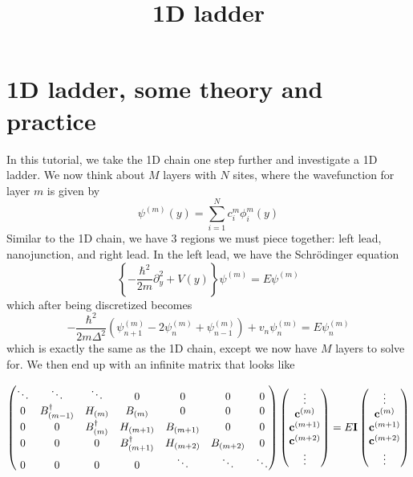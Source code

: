 \documentclass[11pt]{article}
\title{1D ladder}
\begin{document}
    
    
    \maketitle
    
    

    
    \section{1D ladder, some theory and
practice}\label{d-ladder-some-theory-and-practice}

In this tutorial, we take the 1D chain one step further and investigate
a 1D ladder. We now think about \(M\) layers with \(N\) sites, where the
wavefunction for layer \(m\) is given by \[
\psi^{(m)}(y) = \sum_{i=1}^{N} c_i^m \phi_i^m(y)
\] Similar to the 1D chain, we have 3 regions we must piece together:
left lead, nanojunction, and right lead. In the left lead, we have the
Schrödinger equation \[
\left\{-\frac{\hbar^2}{2m}\partial_y^2 + V(y)\right\}\psi^{(m)} = E\psi^{(m)}
\] which after being discretized becomes \[
-\frac{\hbar^2}{2m\Delta^2}(\psi_{n+1}^{(m)} - 2 \psi_{n}^{(m)} + \psi_{n-1}^{(m)}) + v_n\psi_n^{(m)} = E\psi_n^{(m)}
\] which is exactly the same as the 1D chain, except we now have \(M\)
layers to solve for. We then end up with an infinite matrix that looks
like

\begin{equation}
\begin{pmatrix}
\ddots & \ddots         & \ddots       & 0         & 0      & 0       & 0 \\
0 & B_{(m-1)}^{\dagger} & H_{(m)}          & B_{(m)}        & 0       & 0      & 0 \\
0 & 0        & B_{(m)}^{\dagger} & H_{(m+1)}          & B_{(m+1)} & 0      & 0 \\
0 & 0        & 0       & B_{(m+1)}^{\dagger} & H_{(m+2)}          & B_{(m+2)} & 0\\
0 & 0         & 0       & 0          & \ddots       & \ddots       & \ddots 
\end{pmatrix}
\begin{pmatrix}
\vdots\\
{\bf c}^{(m)}\\
{\bf c}^{(m+1)}\\
{\bf c}^{(m+2)}\\
\vdots
\end{pmatrix}
=
E{\bf I}
\begin{pmatrix}
\vdots\\
{\bf c}^{(m)}\\
{\bf c}^{(m+1)}\\
{\bf c}^{(m+2)}\\
\vdots
\end{pmatrix}
\end{equation}
\end{document}
